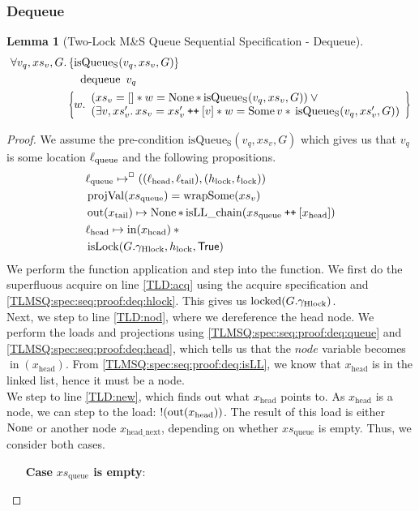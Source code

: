 \documentclass[a4paper, 10pt]{report}
\theoremstyle{definition}
\newtheorem{lemma}[theorem]{Lemma}
\newcommand{\isLock}{\operatorname{isLock}}
\newcommand{\locked}{\operatorname{locked}}
\newcommand{\dequeue}{\operatorname{dequeue}}
\newcommand{\msq}{M\&S Queue}
\newcommand{\tlmsq}{Two-Lock \msq{}}
\newcommand{\isqueueseq}{\operatorname{isQueue_{S}}}
\newcommand{\vq}{v_q}
\newcommand{\xsqueue}{xs_{\mathrm{queue}}}
\newcommand{\isLLchain}{\operatorname{isLL\_chain}}
\newcommand{\projval}{\operatorname{projVal}}
\newcommand{\wrapsome}{\operatorname{wrapSome}}
\newcommand{\locN}[1]{\loc_{\mathrm{#1}}}
\newcommand{\lochead}{\locN{head}}
\newcommand{\loctail}{\locN{tail}}
\newcommand{\locqueue}{\locN{queue}}
\newcommand{\nodeval}{\valB}
\newcommand{\nIn}[1]{\operatorname{in}(#1)}
\newcommand{\nOut}[1]{\operatorname{out}(#1)}
\newcommand{\node}{x}
\newcommand{\nodeN}[1]{\node_{\mathrm{#1}}}
\newcommand{\nodehead}{\nodeN{head}}
\newcommand{\nodetail}{\nodeN{tail}}
\newcommand{\nodeheadnext}{\nodeN{head\_next}}
\newcommand{\absvalue}{\val}
\newcommand{\absvalueList}{xs_v}
\newcommand{\Hlock}{h_{\mathrm{lock}}}
\newcommand{\Tlock}{t_{\mathrm{lock}}}
\newcommand{\Qg}{G}
\newcommand{\ghlock}{\gname_{\mathrm{Hlock}}}
\newcommand\catenate{\mathbin{\text{\ttfamily\upshape ++}}}
\newcommand{\seqspecdeqHT}[3]{\hoareV[t]{\isqueueseq(#1, #2, #3)}{\dequeue \ #1}{\nodeval . \begin{array}{l}(#2 = [] \star{} \nodeval = \None \star{} \isqueueseq(#1, #2, #3)) \lor{}\\ (\Exists \absvalue, #2' . #2 = #2' \catenate [\absvalue] \star{} \nodeval = \Some \absvalue \star{} \isqueueseq(#1, #2', #3)) \end{array}}}
\newcommand{\seqspecdeqGen}[3]{\All #1, #2, #3. \seqspecdeqHT{#1}{#2}{#3}}
\newcommand{\seqspecdeq}{\seqspecdeqGen{\vq}{\absvalueList}{\Qg}}
\begin{document}
\subsubsection{Dequeue}
\begin{lemma}[\tlmsq{} Sequential Specification - Dequeue]\label{TLMSQ:spec:seq:dequeue}
  \begin{equation*}
    \seqspecdeq
  \end{equation*}
\end{lemma}
\begin{proof}
We assume the pre-condition $\isqueueseq(\vq, \absvalueList, \Qg)$ which gives us that $\vq$ is some location $\locqueue$ and the following propositions.
\begin{align}
  &\locqueue \mapsto^{\persistently} ((\lochead, \loctail), (\Hlock, \Tlock))\label{TLMSQ:spec:seq:proof:deq:queue}\\
  &\projval(\xsqueue) = \wrapsome(\absvalueList)\label{TLMSQ:spec:seq:proof:deq:rel}\\
  &\nOut{\nodetail} \mapsto \None \star{} \isLLchain (\xsqueue \catenate [\nodehead])\label{TLMSQ:spec:seq:proof:deq:isLL}\\
  &\lochead \mapsto \nIn{\nodehead} \star{}\label{TLMSQ:spec:seq:proof:deq:head}\\
  &\isLock(\Qg.\ghlock, \Hlock, \TRUE)\label{TLMSQ:spec:seq:proof:deq:hlock}
\end{align}
We perform the function application and step into the function. We first do the superfluous acquire on line \ref{TLD:acq} using the acquire specification and \ref{TLMSQ:spec:seq:proof:deq:hlock}. This gives us $\locked(\Qg.\ghlock)$.\\
Next, we step to line \ref{TLD:nod}, where we dereference the head node. We perform the loads and projections using \ref{TLMSQ:spec:seq:proof:deq:queue} and \ref{TLMSQ:spec:seq:proof:deq:head}, which tells us that the $node$ variable becomes $\nIn{\nodehead}$. From \ref{TLMSQ:spec:seq:proof:deq:isLL}, we know that $\nodehead$ is in the linked list, hence it must be a node.\\
We step to line \ref{TLD:new}, which finds out what $\nodehead$ points to. As $\nodehead$ is a node, we can step to the load: $\deref (\nOut{\nodehead})$. The result of this load is either $\operatorname{None}$ or another node $\nodeheadnext$, depending on whether $\xsqueue$ is empty. Thus, we consider both cases.
\begin{itemize}
  \item[\textbf{Case}] \textbf{$\xsqueue$ is empty}:

\end{itemize}
\end{proof}
\end{document}
